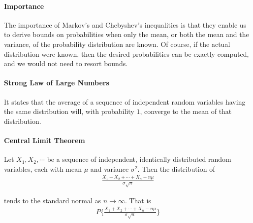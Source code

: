 \documentclass[10 pt,final]{article}
\newcommand{\impo}[1]{{\color{magenta} #1}}
\begin{document}
\paragraph{Importance} The importance of Markov's and Chebyshev's inequalities is that they enable us to \impo{derive bounds} on probabilities when only the mean, or both the mean and the variance, of the probability distribution are known. Of course, if the actual distribution were known, then the desired probabilities can be exactly computed, and we would not need to resort bounds.


\paragraph{Strong Law of Large Numbers} It states that the \impo{average} of a sequence of independent random variables having the same distribution will, with probability $1$, \impo{converge to the mean} of that distribution.


\paragraph{Central Limit Theorem} Let $X_1, X_2, \cdots$ be a sequence of independent, identically distributed random variables, each with mean $\mu$ and variance $\sigma^2$. Then the distribution of 
\begin{align*}
\frac{X_1 + X_2 + \cdots + X_n - n\mu}{\sigma \sqrt{n}}
\end{align*}

tends to the standard normal as $n \to \infty$. That is
\begin{align*}
P\{\frac{X_1 + X_2 + \cdots + X_n - n\mu}{\sigma \sqrt{n}}\} 
\end{align*}


\end{document}

